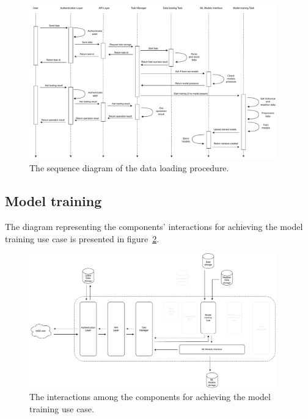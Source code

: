 \begin{figure}[H]
\centering
\includegraphics[width=0.95\textwidth]{images/architecture_data_loading_sequence}
\caption{The sequence diagram of the data loading procedure.}
\label{fig:loadingsequence}
\end{figure}


\vspace{0.1 cm}
\subsection{Model training}
\label{sec:training}
\vspace{0.1 cm}

The diagram representing the components' interactions for achieving the model training use case is presented in figure~\ref{fig:traininginteractions}.

\begin{figure}[H]
\centering
\includegraphics[width=0.95\textwidth]{images/architecture_training_interactions}
\caption{The interactions among the components for achieving the model training use case.}
\label{fig:traininginteractions}
\end{figure}

